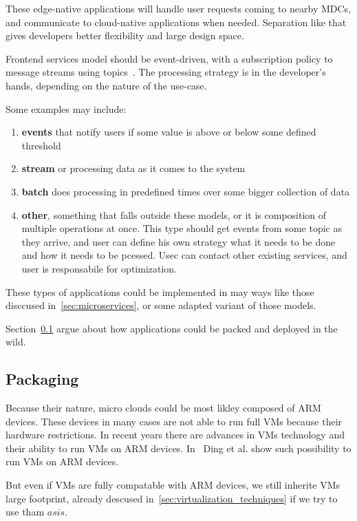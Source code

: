 These edge-native applications will handle user requests coming to nearby MDCs, and communicate to cloud-native applications when needed. Separation like that gives developers better flexibility and large design space. 

Frontend services model should be event-driven, with a subscription policy to message streams using topics~\cite{inproceedingsBeck}. The processing strategy is in the developer's hands, depending on the nature of the use-case. 

Some examples may include:

\begin{enumerate}[start=1,label={(\bfseries \arabic*)}]
	\item \textbf{events} that notify users if some value is above or below some defined threshold 
	\item \textbf{stream} or processing data as it comes to the system 
	\item \textbf{batch} does processing in predefined times over some bigger collection of data 
	\item \textbf{other}, something that falls outside these models, or it is composition of multiple operations at once. This type should get events from some topic as they arrive, and user can define his own strategy what it needs to be done and how it needs to be pcessed. Usec can contact other existing services, and user is responsabile for optimization.
\end{enumerate}

These types of applications could be implemented in may ways like those disccused in~\ref{sec:microservices}, or some adapted variant of those models.

Section~\ref{sec:packaging} argue about how applications could be packed and deployed in the wild.
%
\subsection{Packaging}\label{sec:packaging}
%
Because their nature, micro clouds could be most likley composed of ARM devices. These devices in many cases are not able to run full VMs because their hardware restrictions. In recent years there are advances in VMs technology and their ability to run VMs on ARM devices. In~\cite{Ding12armvisor} Ding et al. show such possibility to run VMs on ARM devices.

But even if VMs are fully compatable with ARM devices, we still inherite VMs large footprint, already descused in~\ref{sec:virtualization_techniques} if we try to use tham $as is$.

